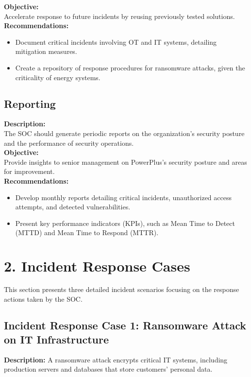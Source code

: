 \textbf{Objective:} \\
Accelerate response to future incidents by reusing previously tested solutions. \\

\textbf{Recommendations:}
\begin{itemize}
    \item Document critical incidents involving OT and IT systems, detailing mitigation measures.
    \item Create a repository of response procedures for ransomware attacks, given the criticality of energy systems.
\end{itemize}

\subsection*{ Reporting}
\textbf{Description:} \\
The SOC should generate periodic reports on the organization's security posture and the performance of security operations. \\

\textbf{Objective:} \\
Provide insights to senior management on PowerPlus’s security posture and areas for improvement. \\

\textbf{Recommendations:}
\begin{itemize}
    \item Develop monthly reports detailing critical incidents, unauthorized access attempts, and detected vulnerabilities.
    \item Present key performance indicators (KPIs), such as Mean Time to Detect (MTTD) and Mean Time to Respond (MTTR).
\end{itemize}

\section*{2. Incident Response Cases}

This section presents three detailed incident scenarios focusing on the response actions taken by the SOC.

\subsection{Incident Response Case 1: Ransomware Attack on IT Infrastructure}

\textbf{Description:}  
A ransomware attack encrypts critical IT systems, including production servers and databases that store customers' personal data.

